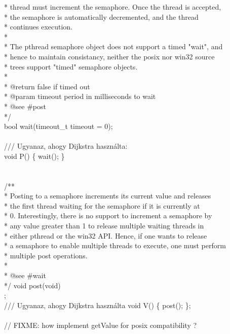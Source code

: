 \documentclass[fleqn,10pt,a4paper,titlepage]{article}
\begin{document}
{     * thread must increment the semaphore.  Once the thread is accepted,\\
     * the semaphore is automatically decremented, and the thread\\
     * continues execution.\\
     *\\
     * The pthread semaphore object does not support a timed "wait", and\\
     * hence to maintain consistancy, neither the posix nor win32 source\\
     * trees support "timed" semaphore objects.\\
     *\\
     * @return false if timed out\\
     * @param timeout period in milliseconds to wait\\
     * @see \#post\\
     */\\
    bool wait(timeout\_t timeout = 0);\\
    \\
    /// Ugyanaz, ahogy Dijkstra használta:\\
    void P() \{ wait(); \}\\
    \\
    \\
    /**\\
     * Posting to a semaphore increments its current value and releases\\
     * the first thread waiting for the semaphore if it is currently at\\
     * 0.  Interestingly, there is no support to increment a semaphore by\\
     * any value greater than 1 to release multiple waiting threads in\\
     * either pthread or the win32 API.  Hence, if one wants to release\\
     * a semaphore to enable multiple threads to execute, one must perform\\
     * multiple post operations.\\
     *\\
     * @see \#wait\\
     */
    void post(void)\\;
    \\
    /// Ugyanaz, ahogy Dijkstra használta
    void V() \{ post(); \};\\
    \\
    // FIXME: how implement getValue for posix compatibility ?\\
}
\end{document}

